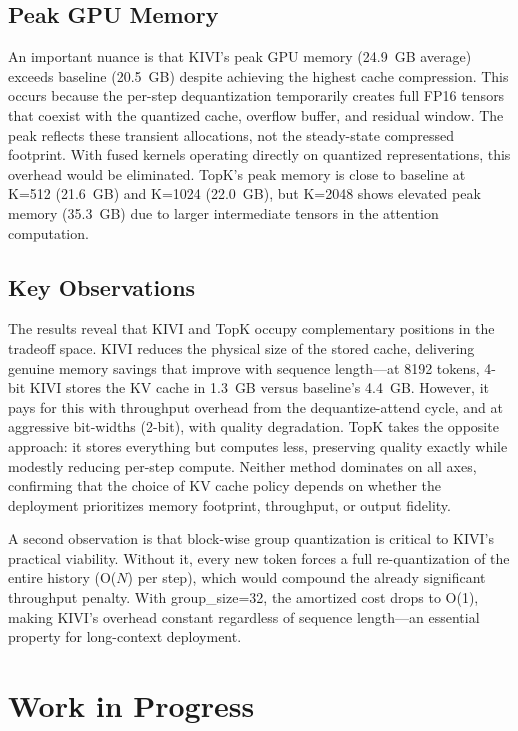 \documentclass[conference]{IEEEtran}
\begin{document}
\subsection{Peak GPU Memory}

An important nuance is that KIVI's peak GPU memory (24.9~GB average) exceeds baseline (20.5~GB) despite achieving the highest cache compression. This occurs because the per-step dequantization temporarily creates full FP16 tensors that coexist with the quantized cache, overflow buffer, and residual window. The peak reflects these transient allocations, not the steady-state compressed footprint. With fused kernels operating directly on quantized representations, this overhead would be eliminated. TopK's peak memory is close to baseline at K=512 (21.6~GB) and K=1024 (22.0~GB), but K=2048 shows elevated peak memory (35.3~GB) due to larger intermediate tensors in the attention computation.

\subsection{Key Observations}

The results reveal that KIVI and TopK occupy complementary positions in the tradeoff space. KIVI reduces the physical size of the stored cache, delivering genuine memory savings that improve with sequence length---at 8192 tokens, 4-bit KIVI stores the KV cache in 1.3~GB versus baseline's 4.4~GB. However, it pays for this with throughput overhead from the dequantize-attend cycle, and at aggressive bit-widths (2-bit), with quality degradation. TopK takes the opposite approach: it stores everything but computes less, preserving quality exactly while modestly reducing per-step compute. Neither method dominates on all axes, confirming that the choice of KV cache policy depends on whether the deployment prioritizes memory footprint, throughput, or output fidelity.

A second observation is that block-wise group quantization is critical to KIVI's practical viability. Without it, every new token forces a full re-quantization of the entire history (O($N$) per step), which would compound the already significant throughput penalty. With group\_size=32, the amortized cost drops to O(1), making KIVI's overhead constant regardless of sequence length---an essential property for long-context deployment.

\section{Work in Progress}
\end{document}
